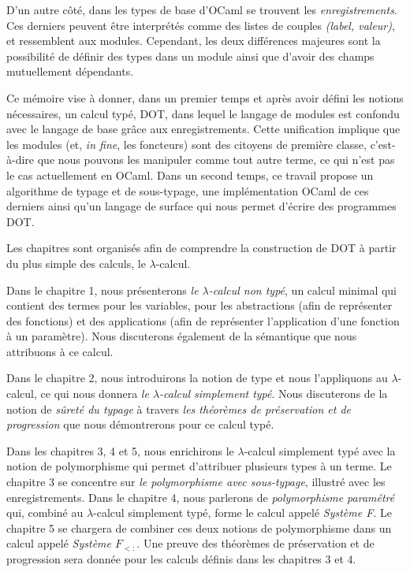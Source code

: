 D'un autre côté, dans les types de base d'OCaml se trouvent les
\textit{enregistrements}. Ces derniers peuvent être interprétés comme des listes
de couples \textit{(label, valeur)}, et ressemblent aux modules. Cependant, les deux
différences majeures sont la possibilité de définir des types dans un
module ainsi que d'avoir des champs mutuellement dépendants.

Ce mémoire vise à donner, dans un premier temps et après avoir défini les notions
nécessaires, un calcul typé, DOT\cite{WF-DOT-2016}, dans lequel le
langage de modules est confondu avec le langage de base grâce aux
enregistrements. Cette unification implique
que les modules (et, \textit{in fine}, les foncteurs) sont des citoyens de première
classe, c'est-à-dire que nous pouvons les manipuler comme tout autre terme, ce qui
n'est pas le cas actuellement en OCaml.
Dans un second temps, ce travail propose un algorithme de typage et de
sous-typage, une implémentation OCaml de ces derniers ainsi qu'un langage de
surface qui nous permet d'écrire des programmes DOT.


Les chapitres sont organisés afin de comprendre la construction de DOT
à partir du plus simple des calculs, le $\lambda$-calcul.

Dans le chapitre 1, nous présenterons \textit{le $\lambda$-calcul non typé}, un calcul
minimal qui contient des termes pour les variables, pour les abstractions (afin
de représenter des fonctions) et des applications (afin de représenter
l'application d'une fonction à un paramètre). Nous discuterons également de la
sémantique que nous attribuons à ce calcul.

Dans le chapitre 2, nous introduirons la notion de type et nous l'appliquons au
$\lambda$-calcul, ce qui nous donnera \textit{le $\lambda$-calcul simplement typé}. Nous
discuterons de la notion de \textit{sûreté du typage} à travers \textit{les théorèmes
de préservation et de progression} que nous démontrerons pour ce calcul typé.

Dans les chapitres 3, 4 et 5, nous enrichirons le $\lambda$-calcul simplement
typé avec la notion de polymorphisme qui permet d'attribuer plusieurs types à un
terme. Le chapitre 3 se concentre sur \textit{le polymorphisme avec sous-typage},
illustré avec les enregistrements.
Dans le chapitre 4, nous parlerons de
\textit{polymorphisme paramétré} qui, combiné au $\lambda$-calcul simplement typé, forme
le calcul appelé \textit{Système F}.
Le chapitre 5 se chargera de combiner ces deux notions de polymorphisme dans un
calcul appelé \textit{Système $F_{<:}$}.
Une preuve des théorèmes de préservation et de progression sera donnée pour
les calculs définis dans les chapitres 3 et 4.

